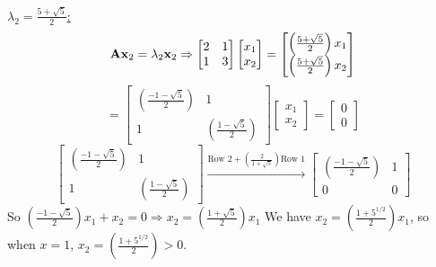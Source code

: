         \newline
        \underline{$\lambda_2 = \frac{5 + \sqrt{5}}{2}$:}
        \[
            \bold{A}\bold{x}_2 = \lambda_2 \bold{x}_2
            \Rightarrow
            \begin{bmatrix}
                2 & 1 \\
                1 & 3
            \end{bmatrix}
            \begin{bmatrix}
                x_1 \\
                x_2
            \end{bmatrix}
            =
            \begin{bmatrix}
                \left(\frac{5 + \sqrt{5}}{2}\right)x_1 \\
                \left(\frac{5 + \sqrt{5}}{2}\right)x_2
            \end{bmatrix}
        \]
        \[
            =
            \begin{bmatrix}
                \left(\frac{-1 - \sqrt{5}}{2}\right) & 1 \\
                1 & \left(\frac{1 - \sqrt{5}}{2}\right)
            \end{bmatrix}
            \begin{bmatrix}
                x_1 \\
                x_2
            \end{bmatrix}
            =
            \begin{bmatrix}
                0 \\
                0
            \end{bmatrix}
        \]
        \[
            \begin{bmatrix}
                \left(\frac{-1 - \sqrt{5}}{2}\right) & 1 \\
                1 & \left(\frac{1 - \sqrt{5}}{2}\right)
            \end{bmatrix}
            \overset{\text{Row 2} + \left(\frac{2}{1 + \sqrt{5}}\right)\text{Row 1}}{\longrightarrow}
            \begin{bmatrix}
                \left(\frac{-1 - \sqrt{5}}{2}\right) & 1 \\
                0 & 0
            \end{bmatrix}
        \]
        So $\left(\frac{-1 - \sqrt{5}}{2}\right)x_1 + x_2 = 0 \Rightarrow x_2 = \left(\frac{1 + \sqrt{5}}{2}\right)x_1$
        \newline
        We have $x_2 = \left(\frac{1 + 5^{1/2}}{2}\right)x_1$, so when $x = 1$, $x_2 = \left(\frac{1 + 5^{1/2}}{2}\right) > 0$.
